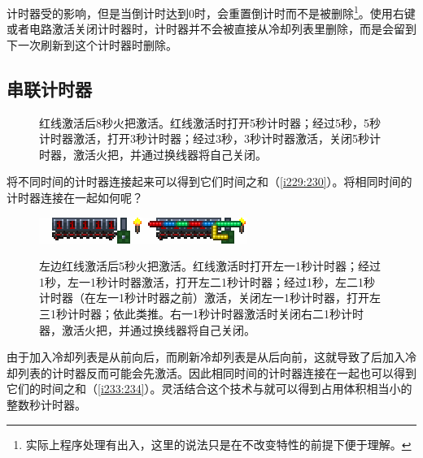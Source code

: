 计时器受的影响，但是当倒计时达到0时，会重置倒计时而不是被删除\footnote{实际上程序处理有出入，这里的说法只是在不改变特性的前提下便于理解。}。使用右键或者电路激活关闭计时器时，计时器并不会被直接从冷却列表里删除，而是会留到下一次刷新到这个计时器时删除。

\subsection{串联计时器}\label{sec20}
\begin{figure}[!ht]
\begin{center}
\qquad
{}
\end{center}
\caption{红线激活后8秒火把激活。红线激活时打开5秒计时器；经过5秒，5秒计时器激活，打开3秒计时器；经过3秒，3秒计时器激活，关闭5秒计时器，激活火把，并通过换线器将自己关闭。}
\label{i229:230}
\end{figure}
将不同时间的计时器连接起来可以得到它们时间之和（\autoref{i229:230}）。将相同时间的计时器连接在一起如何呢？

\begin{figure}[!ht]
\begin{center}
\includegraphics{images/233.png}\qquad\includegraphics{images/234.png}
\end{center}
\caption{左边红线激活后5秒火把激活。红线激活时打开左一1秒计时器；经过1秒，左一1秒计时器激活，打开左二1秒计时器；经过1秒，左二1秒计时器（在左一1秒计时器之前）激活，关闭左一1秒计时器，打开左三1秒计时器；依此类推。右一1秒计时器激活时关闭右二1秒计时器，激活火把，并通过换线器将自己关闭。}
\label{i233:234}
\end{figure}

由于加入冷却列表是从前向后，而刷新冷却列表是从后向前，这就导致了后加入冷却列表的计时器反而可能会先激活。因此相同时间的计时器连接在一起也可以得到它们的时间之和（\autoref{i233:234}）。灵活结合这个技术与就可以得到占用体积相当小的整数秒计时器。

